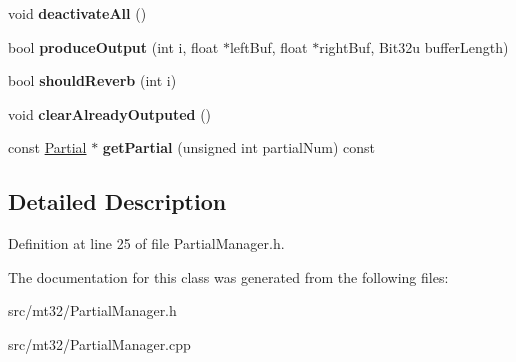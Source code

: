 \begin{DoxyCompactItemize}
\item 
\hypertarget{classMT32Emu_1_1PartialManager_a76d3f3b2267d10040a686e21aab1f75e}{void {\bfseries deactivate\-All} ()}\label{classMT32Emu_1_1PartialManager_a76d3f3b2267d10040a686e21aab1f75e}

\item 
\hypertarget{classMT32Emu_1_1PartialManager_a47a7d555ddc720bbfb79c7a60ce3c5a4}{bool {\bfseries produce\-Output} (int i, float $\ast$left\-Buf, float $\ast$right\-Buf, Bit32u buffer\-Length)}\label{classMT32Emu_1_1PartialManager_a47a7d555ddc720bbfb79c7a60ce3c5a4}

\item 
\hypertarget{classMT32Emu_1_1PartialManager_a0121369661069537aa3d5ca2f0b4a6fe}{bool {\bfseries should\-Reverb} (int i)}\label{classMT32Emu_1_1PartialManager_a0121369661069537aa3d5ca2f0b4a6fe}

\item 
\hypertarget{classMT32Emu_1_1PartialManager_abefaf5b8b7d5e36eee3c8cd84fbaa5d0}{void {\bfseries clear\-Already\-Outputed} ()}\label{classMT32Emu_1_1PartialManager_abefaf5b8b7d5e36eee3c8cd84fbaa5d0}

\item 
\hypertarget{classMT32Emu_1_1PartialManager_a43e079113ba5478eee9a9206cf34e733}{const \hyperlink{classMT32Emu_1_1Partial}{Partial} $\ast$ {\bfseries get\-Partial} (unsigned int partial\-Num) const }\label{classMT32Emu_1_1PartialManager_a43e079113ba5478eee9a9206cf34e733}

\end{DoxyCompactItemize}


\subsection{Detailed Description}


Definition at line 25 of file Partial\-Manager.\-h.



The documentation for this class was generated from the following files\-:\begin{DoxyCompactItemize}
\item 
src/mt32/Partial\-Manager.\-h\item 
src/mt32/Partial\-Manager.\-cpp\end{DoxyCompactItemize}
